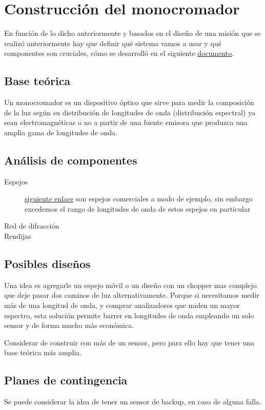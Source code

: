 \documentclass[titlepage,11pt]{article}
\begin{document}
\section{Construcción del monocromador}
En función de lo dicho anteriormente y basados en el diseño de una misión que se realizó anteriormente hay que definir qué sistema vamos a usar y qué componentes son cruciales, cómo se desarrolló en el siguiente \href{https://drive.google.com/drive/u/1/folders/1x8ssW4P_UQonP1F5NF6wIi2mThU0y0k_}{documento}.

\subsection{Base teórica}
Un monocromador es un dispositivo óptico que sirve para medir la composición de la luz según su distribución de longitudes de onda (distribución espectral) ya sean electromagnéticas o no a partir de una fuente emisora que produzca una amplia gama de longitudes de onda.

\subsection{Análisis de componentes}
\begin{description}
    \item[Espejos] 	 \href{https://www.thorlabs.com/newgrouppage9.cfm?objectgroup_id=1161}{siguiente enlace} son espejos comerciales a modo de ejemplo, sin embargo excedemos el rango de longitudes de onda de estos espejos en particular
    \item[Red de difracción] 
    \item[Rendijas] 
\end{description}

\subsection{Posibles diseños}
Una idea es agregarle un espejo móvil o un diseño con un chopper mas complejo que deje pasar dos caminos de luz alternativamente. Porque si necesitamos medir más de una longitud de onda, y comprar analizadores que miden un mayor espectro, esta solución permite barrer en longitudes de onda empleando un solo sensor y de forma mucho más económica.

Considerar de construir con más de un sensor, pero para ello hay que tener una base teórica más amplia.

\subsection{Planes de contingencia}
Se puede considerar la idea de tener un sensor de backup, en caso de alguna falla.
\end{document}
